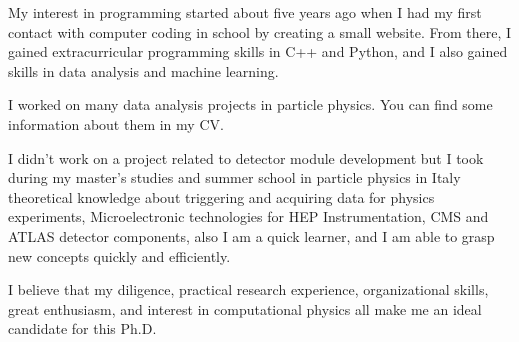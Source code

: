 \documentclass[11pt, a4paper]{awesome-cv}
\begin{document}
\begin{cvletter}
My interest in programming started about five years ago when I had my first contact with computer coding in school by creating a small website. From there, I gained extracurricular programming skills in C++ and Python, and I also gained skills in data analysis and machine learning.

I worked on many data analysis projects in particle physics. You can find some information about them in my CV.

I didn’t work on a project related to detector module development but I took during my master’s studies and summer school in particle physics in Italy theoretical knowledge about triggering and acquiring data for physics experiments, Microelectronic technologies for HEP Instrumentation, CMS and ATLAS detector components, also I am a quick learner, and I am able to grasp new concepts quickly and efficiently. 

I believe that my diligence, practical research experience, organizational skills, great enthusiasm, and interest in computational physics all make me an ideal candidate for this Ph.D.

\end{cvletter}



\makeletterclosing
\end{document}
